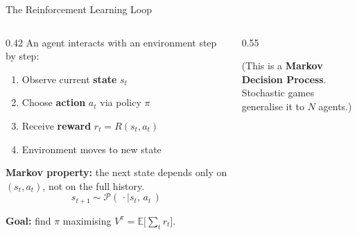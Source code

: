 \documentclass[aspectratio=169,11pt]{beamer}
\newcommand{\E}{\mathbb{E}}
\begin{document}
\begin{frame}{The Reinforcement Learning Loop}
  \begin{columns}[c]
    \begin{column}{0.42\textwidth}
      An agent interacts with an environment step by step:
      \begin{enumerate}
        \item Observe current \textbf{state} $s_t$
        \item Choose \textbf{action} $a_t$ via policy $\pi$
        \item Receive \textbf{reward} $r_t = R(s_t, a_t)$
        \item Environment moves to new state
      \end{enumerate}

      \bigskip

      \textbf{Markov property:} the next state depends only on
      $(s_t, a_t)$, not on the full history.
      \[
        s_{t+1} \sim \mathcal{P}(\,\cdot \mid s_t,\, a_t\,)
      \]

      \textbf{Goal:} find $\pi$ maximising
      $V^\pi = \E\bigl[\sum_t r_t\bigr]$.
    \end{column}
    \begin{column}{0.55\textwidth}
      \centering

      \vspace{0.4cm}
      {\small (This is a \textbf{Markov Decision Process}.\\
      Stochastic games generalise it to $N$ agents.)}
    \end{column}
  \end{columns}
\end{frame}
\end{document}
